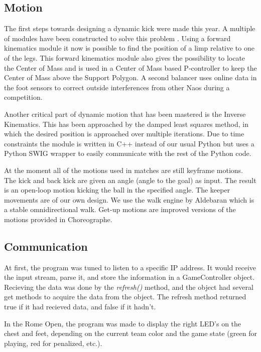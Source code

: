 \documentclass[11pt,a4paper,oneside]{article}
\begin{document}
\subsection{Motion}
The first steps towards designing a dynamic kick were made this year. A multiple of
modules have been constructed to solve this problem \cite{Becht2012}.
Using a  forward kinematics module it now is possible to 
find the position of a limp relative to one of the legs. This forward
kinematics module also gives the possibility to locate the Center of Mass and
is used in a Center of Mass based P-controller to keep the Center of Mass above the
Support Polygon. A second balancer uses online data in the foot sensors to correct outside interferences from other Naos during a competition. 

Another critical part of dynamic motion that has been mastered is the Inverse Kinematics. This has been approached by the damped least squares method, in which the desired position is approached over multiple iterations. Due to time constraints the module is written in C++ instead of our usual Python but uses a Python SWIG wrapper to easily communicate with the rest of the Python code.
 
At the moment all of the motions used in matches are still keyframe motions. The kick and back kick are given an angle (angle to the goal) as input. The result is an open-loop motion kicking the ball in the specified angle. The keeper movements are of our own design. We use the walk engine by Aldebaran which is a stable omnidirectional walk. Get-up motions are improved versions of the motions provided in Choreographe.


\subsection{Communication}
\label{sec:communication}
At first, the program was tuned to listen to a specific IP address. It would receive the input stream, parse it, and store the information in a GameController object. Recieving the data was done by the \textit{refresh()} method, and the object had several get methods to acquire the data from the object. The refresh method returned true if it had recieved data, and false if it hadn't.

In the Rome Open, the program was made to display the right LED’s on the chest and feet, depending on the current team color and the game state (green for playing, red for penalized, etc.). 
\end{document}
